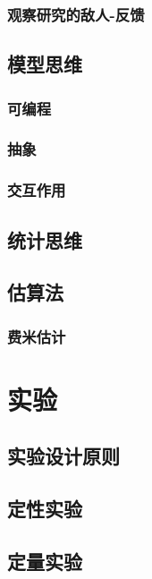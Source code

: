 \documentclass[]{book}
\begin{document}
\subsection{观察研究的敌人-反馈}\label{-}

\section{模型思维}

\subsection{可编程}

\subsection{抽象}

\subsection{交互作用}

\section{统计思维}

\section{估算法}

\subsection{费米估计}

\chapter{实验}

\section{实验设计原则}

\section{定性实验}

\section{定量实验}
\end{document}
